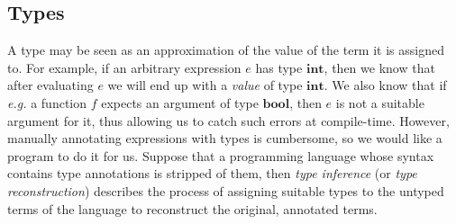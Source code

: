 \documentclass[10pt,a4paper]{exam}
\begin{document}
\begin{questions}

\section*{Types}

\question A type may be seen as an approximation of the value of the term it is assigned to. For example, if an arbitrary expression $e$ has type $\mathbf{int}$, then we know that after evaluating $e$ we will end up with a \emph{value} of type $\mathbf{int}$. We also know that if \emph{e.g.} a function $f$ expects an argument of type $\mathbf{bool}$, then $e$ is not a suitable argument for it, thus allowing us to catch such errors at compile-time. However, manually annotating expressions with types is cumbersome, so we would like a program to do it for us. Suppose that a programming language whose syntax contains type annotations is stripped of them, then \emph{type inference} (or \emph{type reconstruction}) describes the process of assigning suitable types to the untyped terms of the language to reconstruct the original, annotated terms. 


\end{questions}
\end{document}
